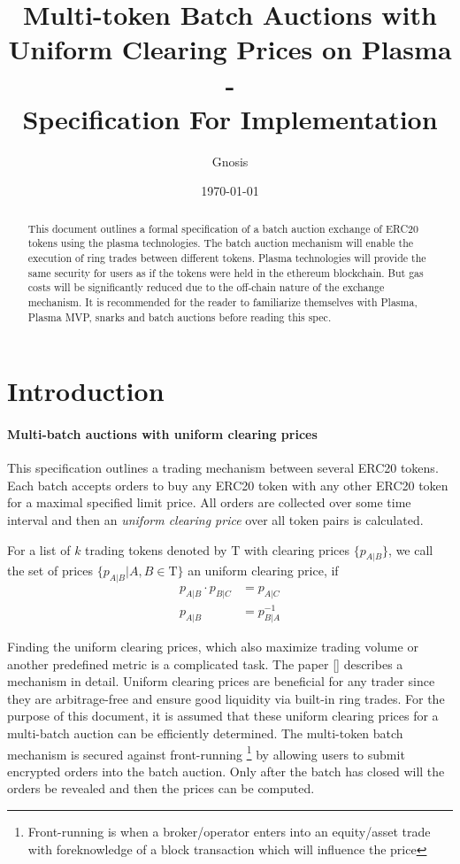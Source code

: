 \documentclass[11pt,parskip=full]{scrartcl}%
\title{
  Multi-token Batch Auctions with Uniform Clearing Prices on Plasma\\
  - \\
  \Large Specification For Implementation}
\author{Gnosis}
\date{\today}
\newcommand{\Tau}{\mathrm{T}}
\newcommand*{\erc}{ERC20 }
\begin{document}
\maketitle


\begin{abstract}

This document outlines a formal specification of a batch auction exchange of ERC20 tokens using the plasma technologies. 
The batch auction mechanism will enable the execution of ring trades between different tokens. 
Plasma technologies will provide the same security for users as if the tokens were held in the ethereum blockchain. 
But gas costs will be significantly reduced due to the off-chain nature of the exchange mechanism. 
It is recommended for the reader to familiarize themselves with Plasma\cite{plasma}, Plasma MVP\cite{MVP}, snarks\cite{snarks} and batch auctions\cite{batch} before reading this spec. 

\end{abstract}

\tableofcontents

\newpage
\section{Introduction}
\label{sec:introduction}

\paragraph{Multi-batch auctions with uniform clearing prices}

This specification outlines a trading mechanism between several \erc tokens. Each batch accepts orders to buy any \erc token with any other \erc token for a maximal specified limit price. All orders are collected over some time interval and then an \emph{uniform clearing price} over all token pairs is calculated. 

For a list of $k$ trading tokens denoted by $\Tau$ with clearing prices $\{p_{A|B}\}$, we call the set of prices $\{p_{A|B}| A,B \in \Tau \}$ an uniform clearing price, if
\begin{align} \label{eq:arbitrage_freeness}
  p_{A|B} \cdot p_{B|C} &= p_{A|C}\\
  p_{A|B} &= p_{B|A}^{-1}
\end{align}


Finding the uniform clearing prices, which also maximize trading volume or another predefined metric is a complicated task. The paper [] describes a mechanism in detail. Uniform clearing prices are beneficial for any trader since they are arbitrage-free and ensure good liquidity via built-in ring trades. For the purpose of this document, it is assumed that these uniform clearing prices for a multi-batch auction can be efficiently determined. \newline
The multi-token batch mechanism is secured against front-running \footnote{Front-running is when a broker/operator enters into an equity/asset trade with foreknowledge of a block transaction which will influence the price} by allowing users to submit encrypted orders into the batch auction. Only after the batch has closed will the orders be revealed and then the prices can be computed. 
\end{document}

